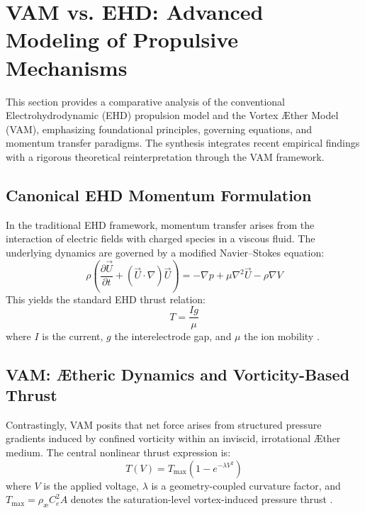 
\section{VAM vs. EHD: Advanced Modeling of Propulsive Mechanisms}


This section provides a comparative analysis of the conventional Electrohydrodynamic (EHD) propulsion model and the Vortex \AE{}ther Model (VAM), emphasizing foundational principles, governing equations, and momentum transfer paradigms. The synthesis integrates recent empirical findings \cite{ehdreview2023} \cite{ehdpropeller2023} \cite{electricfluidsetup2023} \cite{ehdmodeling2023} with a rigorous theoretical reinterpretation through the VAM framework.


\subsection{Canonical EHD Momentum Formulation}
In the traditional EHD framework, momentum transfer arises from the interaction of electric fields with charged species in a viscous fluid. The underlying dynamics are governed by a modified Navier--Stokes equation:
\begin{equation}
\rho \left( \frac{\partial \vec{U}}{\partial t} + (\vec{U} \cdot \nabla)\vec{U} \right) = -\nabla p + \mu \nabla^2 \vec{U} - \rho \nabla V
\end{equation}
This yields the standard EHD thrust relation:
\begin{equation}
T = \frac{I g}{\mu}
\end{equation}
where $I$ is the current, $g$ the interelectrode gap, and $\mu$ the ion mobility \cite{ehdreview2023}.


\subsection{VAM: Ætheric Dynamics and Vorticity-Based Thrust}
Contrastingly, VAM posits that net force arises from structured pressure gradients induced by confined vorticity within an inviscid, irrotational \AE{}ther medium. The central nonlinear thrust expression is:
\begin{equation}
T(V) = T_\text{max}(1 - e^{-\lambda V^2})
\end{equation}
where $V$ is the applied voltage, $\lambda$ is a geometry-coupled curvature factor, and $T_\text{max} = \rho_\text{\ae} C_e^2 A$ denotes the saturation-level vortex-induced pressure thrust \cite{vamderive2024}.


